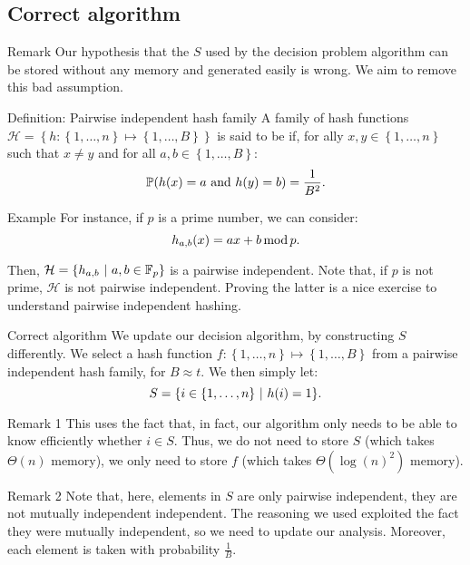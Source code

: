 \documentclass[a4paper]{article}
\begin{document}
\subsection{Correct algorithm}

\begin{parag}{Remark}
    Our hypothesis that the $S$ used by the decision problem algorithm can be stored without any memory and generated easily is wrong. We aim to remove this bad assumption.
\end{parag}

\begin{parag}{Definition: Pairwise independent hash family}
    A family of hash functions $\mathcal{H} = \left\{h: \left\{1, \ldots, n\right\} \mapsto \left\{1, \ldots, B\right\}\right\}$ is said to be  if, for ally $x, y \in \left\{1, \ldots, n\right\}$ such that $x \neq y$ and for all $a, b \in \left\{1, \ldots, B\right\}$: 
    \[\prob\left(h\left(x\right) = a \text{ and } h\left(y\right) = b\right) = \frac{1}{B^2}.\]
    
    \begin{subparag}{Example}
        For instance, if $p$ is a prime number, we can consider: 
        \[h_{a, b}\left(x\right) = ax + b \Mod p.\]

        Then, $\mathcal{H} = \left\{h_{a, b} \suchthat a, b \in \mathbb{F}_p\right\}$ is a pairwise independent. Note that, if $p$ is not prime, $\mathcal{H}$ is not pairwise independent. Proving the latter is a nice exercise to understand pairwise independent hashing.
    \end{subparag}
\end{parag}

\begin{parag}{Correct algorithm}
    We update our decision algorithm, by constructing $S$ differently. We select a hash function $f: \left\{1, \ldots, n\right\} \mapsto \left\{1, \ldots, B\right\}$ from a pairwise independent hash family, for $B \approx t$. We then simply let: 
    \[S = \left\{i \in \left\{1, \ldots, n\right\} \suchthat h\left(i\right) = 1\right\}.\]

    \begin{subparag}{Remark 1}
        This uses the fact that, in fact, our algorithm only needs to be able to know efficiently whether $i \in S$. Thus, we do not need to store $S$ (which takes $\Theta\left(n\right)$ memory), we only need to store $f$ (which takes $\Theta\left(\log\left(n\right)^2\right)$ memory).
    \end{subparag}

    \begin{subparag}{Remark 2}
        Note that, here, elements in $S$ are only pairwise independent, they are not mutually independent independent. The reasoning we used exploited the fact they were mutually independent, so we need to update our analysis. Moreover, each element is taken with probability $\frac{1}{B}$.
    \end{subparag}
\end{parag}
\end{document}
